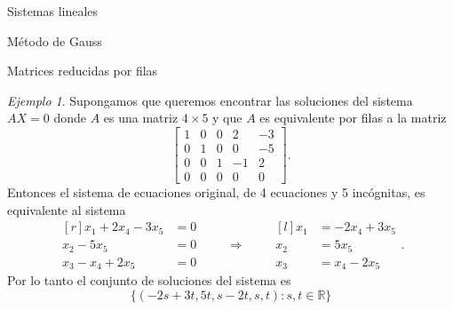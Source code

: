 \documentclass[a4paper,12pt,twoside,spanish,reqno]{amsbook}
\numberwithin{equation}{section}
\theoremstyle{definition}
\theoremstyle{remark}
\newtheorem*{ejemplo*}{Ejemplo}
\newcommand{\R}{\mathbb R}
\begin{document}
\begin{chapter}{Sistemas lineales}
\begin{section}{Método de Gauss }
\begin{subsection}{Matrices reducidas por filas}
                \begin{ejemplo*}
                    Supongamos que queremos encontrar las soluciones del sistema $AX = 0$ donde $A$ es una matriz $4 \times 5$ y que $A$ es equivalente por filas a la matriz
                    \begin{equation*}
                    \begin{bmatrix} 1&0&0&2&-3 \\ 0&1&0&0&-5 \\ 0&0&1&-1&2 \\ 0&0&0&0&0\end{bmatrix}.
                    \end{equation*} 
                    Entonces el sistema de ecuaciones original, de 4 ecuaciones y 5 incógnitas,  es equivalente al sistema
                    \begin{equation*}
                    \begin{matrix*}[r]
                    x_1 +2x_4 -3x_5 &= 0 \\ x_2 -5x_5 &= 0 \\ x_3-x_4+2x_5 &= 0
                    \end{matrix*} 
                    \qquad \Rightarrow \qquad 
                    \begin{matrix*}[l]
                    x_1  &= -2x_4 +3x_5 \\ x_2  &= 5x_5 \\ x_3 &= x_4-2x_5
                    \end{matrix*}. 
                    \end{equation*}
                    Por  lo tanto el conjunto de soluciones del sistema es
                    \begin{equation*}
                    \{(-2s +3t,  5t,  s-2t, s, t): s,t \in \R\}
                    \end{equation*}
                \end{ejemplo*}   
            \end{subsection}
            

\end{section}
\end{chapter}
\end{document}
